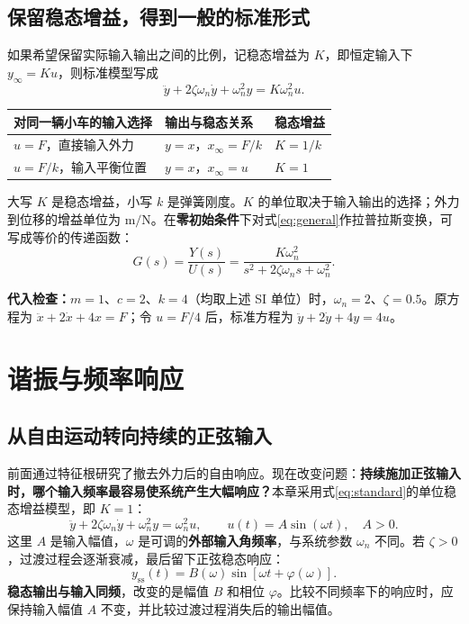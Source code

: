 \documentclass[UTF8,a4paper,11pt,fontset=windows]{ctexart}
\begin{document}
\subsection{保留稳态增益，得到一般的标准形式}
如果希望保留实际输入输出之间的比例，记稳态增益为 $K$，即恒定输入下 $y_\infty=Ku$，则标准模型写成
\begin{equation}\label{eq:general}
  \boxed{\ddot y+2\zeta\omega_n\dot y+\omega_n^2y=K\omega_n^2u.}
\end{equation}
\noindent
\begin{tabularx}{\linewidth}{@{}YYl@{}}
\toprule
对同一辆小车的输入选择 & 输出与稳态关系 & 稳态增益 \\
\midrule
$u=F$，直接输入外力 & $y=x$，$x_\infty=F/k$ & $K=1/k$ \\
$u=F/k$，输入平衡位置 & $y=x$，$x_\infty=u$ & $K=1$ \\
\bottomrule
\end{tabularx}
\par
大写 $K$ 是稳态增益，小写 $k$ 是弹簧刚度。$K$ 的单位取决于输入输出的选择；外力到位移的增益单位为 $\mathrm{m/N}$。在\textbf{零初始条件}下对式\eqref{eq:general}作拉普拉斯变换，可写成等价的传递函数：
\begin{equation}\label{eq:transfer}
  \boxed{G(s)=\frac{Y(s)}{U(s)}=\frac{K\omega_n^2}{s^2+2\zeta\omega_ns+\omega_n^2}.}
\end{equation}

\begin{keybox}
\textbf{代入检查：}$m=1$、$c=2$、$k=4$（均取上述 SI 单位）时，$\omega_n=2$、$\zeta=0.5$。原方程为 $\ddot x+2\dot x+4x=F$；令 $u=F/4$ 后，标准方程为 $\ddot y+2\dot y+4y=4u$。
\end{keybox}

\newpage
\section{谐振与频率响应}

\subsection{从自由运动转向持续的正弦输入}
前面通过特征根研究了撤去外力后的自由响应。现在改变问题：\textbf{持续施加正弦输入时，哪个输入频率最容易使系统产生大幅响应？}本章采用式\eqref{eq:standard}的单位稳态增益模型，即 $K=1$：
\[
  \ddot y+2\zeta\omega_n\dot y+\omega_n^2y=\omega_n^2u,
  \qquad u(t)=A\sin(\omega t),\quad A>0.
\]
这里 $A$ 是输入幅值，$\omega$ 是可调的\textbf{外部输入角频率}，与系统参数 $\omega_n$ 不同。若 $\zeta>0$，过渡过程会逐渐衰减，最后留下正弦稳态响应：
\begin{equation}\label{eq:sine-steady}
  y_{\mathrm{ss}}(t)=B(\omega)\sin\!\left[\omega t+\varphi(\omega)\right].
\end{equation}
\textbf{稳态输出与输入同频}，改变的是幅值 $B$ 和相位 $\varphi$。比较不同频率下的响应时，应保持输入幅值 $A$ 不变，并比较过渡过程消失后的输出幅值。
\end{document}
